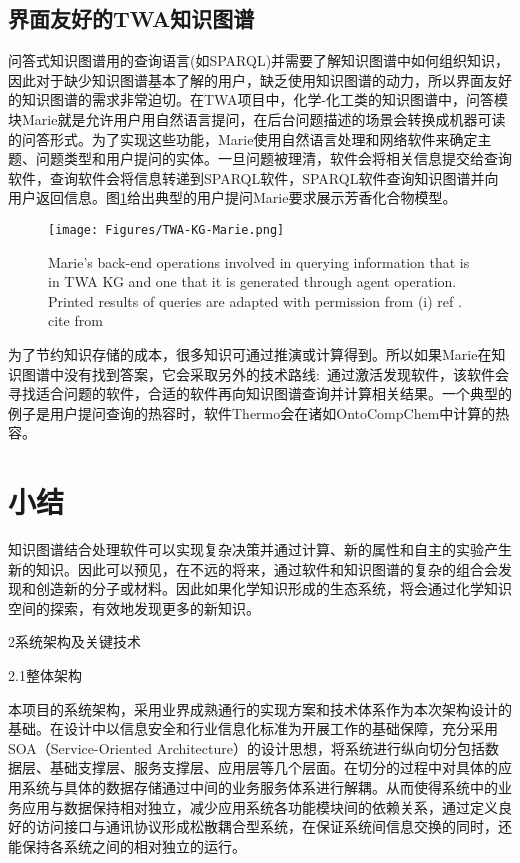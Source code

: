 \subsection{界面友好的\rm{TWA}知识图谱}
问答式知识图谱用的查询语言(如\textrm{SPARQL})并需要了解知识图谱中如何组织知识，因此对于缺少知识图谱基本了解的用户，缺乏使用知识图谱的动力，所以界面友好的知识图谱的需求非常迫切。在\textrm{TWA}项目中，化学-化工类的知识图谱中，问答模块\textrm{Marie}就是允许用户用自然语言提问，在后台问题描述的场景会转换成机器可读的问答形式。为了实现这些功能，\textrm{Marie}使用自然语言处理和网络软件来确定主题、问题类型和用户提问的实体。一旦问题被理清，软件会将相关信息提交给查询软件，查询软件会将信息转递到\textrm{SPARQL}软件，\textrm{SPARQL}软件查询知识图谱并向用户返回信息。图\ref{Fig:TWA-KG-Marie}给出典型的用户提问\textrm{Marie}要求展示芳香化合物模型。
\begin{figure}[h!]
\centering
\texttt{[image: Figures/TWA-KG-Marie.png]}
\caption{\small\textrm{Marie's back-end operations involved in querying information that is in TWA KG and one that it is generated through agent operation. Printed results of queries are adapted with permission from (i) ref \cite{JCIM61-3868_2021}. cite from\cite{ACR56-128_2023}}}%
\label{Fig:TWA-KG-Marie}
\end{figure}
为了节约知识存储的成本，很多知识可通过推演或计算得到。所以如果\textrm{Marie}在知识图谱中没有找到答案，它会采取另外的技术路线:~通过激活发现软件，该软件会寻找适合问题的软件，合适的软件再向知识图谱查询并计算相关结果。一个典型的例子是用户提问查询的热容时，软件\textrm{Thermo}会在诸如\textrm{OntoCompChem}中计算的热容。
\section{小结}
知识图谱结合处理软件可以实现复杂决策并通过计算、新的属性和自主的实验产生新的知识。因此可以预见，在不远的将来，通过软件和知识图谱的复杂的组合会发现和创造新的分子或材料。因此如果化学知识形成的生态系统，将会通过化学知识空间的探索，有效地发现更多的新知识。

2系统架构及关键技术

2.1整体架构

本项目的系统架构，采用业界成熟通行的实现方案和技术体系作为本次架构设计的基础。在设计中以信息安全和行业信息化标准为开展工作的基础保障，充分采用 SOA（Service-Oriented Architecture）的设计思想，将系统进行纵向切分包括数据层、基础支撑层、服务支撑层、应用层等几个层面。在切分的过程中对具体的应用系统与具体的数据存储通过中间的业务服务体系进行解耦。从而使得系统中的业务应用与数据保持相对独立，减少应用系统各功能模块间的依赖关系，通过定义良好的访问接口与通讯协议形成松散耦合型系统，在保证系统间信息交换的同时，还能保持各系统之间的相对独立的运行。



